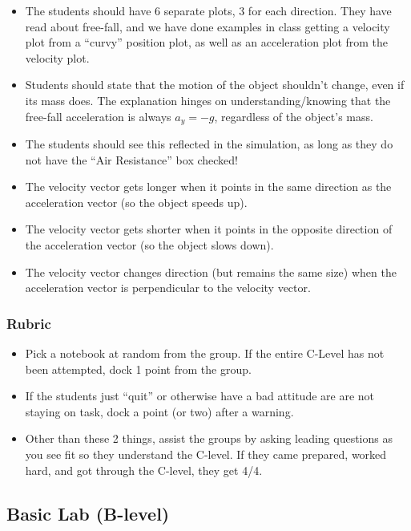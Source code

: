 \documentclass[fleqn,letterpaper]{article}
\begin{document}
\begin{itemize}
 \item{The students should have 6 separate plots, 3 for each direction.  They have read about free-fall, and we have done examples in class getting a velocity plot from a ``curvy'' position plot, as well as an acceleration plot from the velocity plot.}
 \item{Students should state that the motion of the object shouldn't change, even if its mass does.  The explanation hinges on understanding/knowing that the free-fall acceleration is always $a_y = - g$, regardless of the object's mass.}
 \item{The students should see this reflected in the simulation, as long as they do not have the ``Air Resistance'' box checked!}
 \item{The velocity vector gets longer when it points in the same direction as the acceleration vector (so the object speeds up).}
 \item{The velocity vector gets shorter when it points in the opposite direction of the acceleration vector (so the object slows down).}
 \item{The velocity vector changes direction (but remains the same size) when the acceleration vector is perpendicular to the velocity vector.}
\end{itemize}

\subsubsection*{Rubric}

\begin{itemize}
 \item{Pick a notebook at random from the group.  If the entire C-Level has not been attempted, dock 1 point from the group.}
 \item{If the students just ``quit'' or otherwise have a bad attitude are are not staying on task, dock a point (or two) after a warning.}
 \item{Other than these 2 things, assist the groups by asking leading questions as you see fit so they understand the C-level.  If they came prepared, worked hard, and got through the C-level, they get 4/4.}
\end{itemize}


\subsection*{Basic Lab (B-level)}
\end{document}

